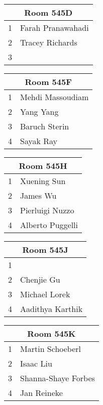 \documentclass{article}
\begin{document}
\Huge
\bfseries

\noindent
\begin{tabular}{|l|l|}
\hline
\multicolumn{2}{|c|}{Room 545D} \\ \hline\hline
1&Farah Pranawahadi\\
2&Tracey Richards\\
3& \\

\hline
\end{tabular}
\pagebreak

\noindent
\begin{tabular}{|l|l|}
\hline
\multicolumn{2}{|c|}{Room 545F} \\ \hline\hline
1&Mehdi Massoudiam\\
2&Yang Yang\\
3&Baruch Sterin\\
4&Sayak Ray\\

\hline
\end{tabular}
\pagebreak

\noindent
\begin{tabular}{|l|l|}
\hline
\multicolumn{2}{|c|}{Room 545H} \\ \hline\hline
1&Xuening Sun\\
2&James Wu\\
3&Pierluigi Nuzzo\\
4&Alberto Puggelli\\

\hline
\end{tabular}
\pagebreak

\noindent
\begin{tabular}{|l|l|}
\hline
\multicolumn{2}{|c|}{Room 545J} \\ \hline\hline
1& \\
2&Chenjie Gu\\
3&Michael Lorek\\
4&Aadithya Karthik\\

\hline
\end{tabular}
\pagebreak

\noindent
\begin{tabular}{|l|l|}
\hline
\multicolumn{2}{|c|}{Room 545K} \\ \hline\hline
1&Martin Schoeberl\\
2&Isaac Liu\\
3&Shanna-Shaye Forbes\\
4&Jan Reineke\\

\hline
\end{tabular}
\pagebreak
\end{document}
